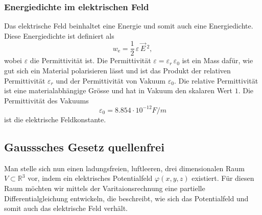 \subsubsection{Energiedichte im elektrischen Feld}
Das elektrische Feld beinhaltet eine Energie und somit auch eine Energiedichte.
Diese Energiedichte ist definiert als
\begin{equation}
w_{\text{e}}
=
\frac{1}{2}\,\varepsilon\,\vec{E}\,^2,
\label{maxwell:section:definiton_energiedichte_elektrischesFeld}
\end{equation}
wobei $\varepsilon$ die Permittivität ist.
Die Permittivität
\(
\varepsilon
=
\varepsilon_r\,\varepsilon_0
\)
ist ein Mass dafür, wie gut sich ein Material polarisieren lässt und ist das Produkt der relativen Permittivität $\varepsilon_r$ und der Permittivität von Vakuum $\varepsilon_0$.
Die relative Permittivität ist eine materialabhängige Grösse und hat in Vakuum den skalaren Wert $1$.
Die Permittivität des Vakuums
\[
\varepsilon_0
=
8.854 \cdot 10^{-12} F/m
\]
ist die elektrische Feldkonstante.

\subsection{Gausssches Gesetz quellenfrei
	\label{maxwell:section:elektrostatik_ohne_quelle}}
Man stelle sich nun einen ladungsfreien, luftleeren, drei dimensionalen Raum $V\subset\mathbb{R}^3$
vor, indem ein elektrisches Potentialfeld $\varphi(x,y,z)$ existiert.
Für diesen Raum möchten wir mittels der Varitaionsrechnung eine partielle Differentialgleichung entwickeln, die beschreibt, wie sich das Potentialfeld und somit auch das elektrische Feld verhält. 


